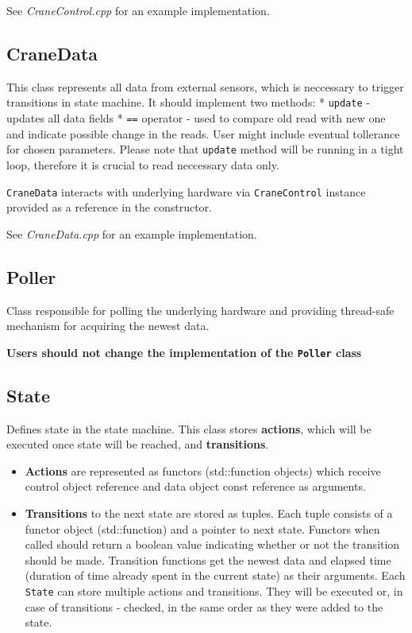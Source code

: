 \documentclass{article}
\begin{document}
See \textit{CraneControl.cpp} for an example
implementation.

\subsection*{CraneData}\label{cranedata}

This class represents all data from external sensors, which is
neccessary to trigger transitions in state machine. It should implement
two methods: * \texttt{update} - updates all data fields * \texttt{==}
operator - used to compare old read with new one and indicate possible
change in the reads. User might include eventual tollerance for chosen
parameters. Please note that \texttt{update} method will be running in a
tight loop, therefore it is crucial to read neccessary data only.

\texttt{CraneData} interacts with underlying hardware via
\texttt{CraneControl} instance provided as a reference in the
constructor.

See \textit{CraneData.cpp} for an example
implementation.

\subsection*{Poller}\label{poller}

Class responsible for polling the underlying hardware and providing
thread-safe mechanism for acquiring the newest data.

\textbf{Users should not change the implementation of the
\texttt{Poller} class}

\subsection*{State}\label{state}

Defines state in the state machine. This class stores \textbf{actions},
which will be executed once state will be reached, and
\textbf{transitions}.

\begin{itemize}
\item
  \textbf{Actions} are represented as functors (std::function objects)
  which receive control object reference and data object const reference
  as arguments.
\item
  \textbf{Transitions} to the next state are stored as tuples. Each
  tuple consists of a functor object (std::function) and a pointer to
  next state. Functors when called should return a boolean value
  indicating whether or not the transition should be made. Transition
  functions get the newest data and elapsed time (duration of time
  already spent in the current state) as their arguments. Each
  \texttt{State} can store multiple actions and transitions. They will
  be executed or, in case of transitions - checked, in the same order as
  they were added to the state.
\end{itemize}
\end{document}
